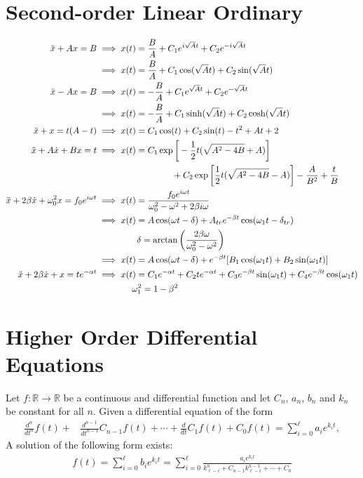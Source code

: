 \section{Second-order Linear Ordinary}
\begin{align}
\ddot{x}+Ax=B &\implies x(t)=\frac{B}{A}+C_1e^{i\sqrt{A}t}+C_2e^{-i\sqrt{A}t} \\ &\implies x(t)=\frac{B}{A}+C_1\cos(\sqrt{A}t)+C_2\sin(\sqrt{A}t) \\
\ddot{x}-Ax=B &\implies x(t)=-\frac{B}{A}+C_1e^{\sqrt{A}t}+C_2e^{-\sqrt{A}t} \\
&\implies x(t)=-\frac{B}{A}+C_1\sinh(\sqrt{A}t)+C_2\cosh(\sqrt{A}t) \\
\ddot{x}+x=t(A-t) &\implies x(t)=C_1\cos(t)+C_2\sin(t)-t^2+At+2 \\ 
\ddot{x}+A\dot{x}+Bx =t &\implies x(t)=C_1\exp\bigg[-\frac{1}{2}t(\sqrt{A^2-4B}+A)\bigg] \\& \hspace{3cm} +C_2\exp\bigg[\frac{1}{2}t(\sqrt{A^2-4B}-A)\bigg]-\frac{A}{B^2}+\frac{t}{B} \\
\ddot{x}+2\beta\dot{x}+\omega_0^2x=f_0e^{i\omega t} &\implies x(t)=\frac{f_0e^{i\omega t}}{\omega_0^2-\omega^2+2\beta i\omega} \\
&\implies x(t)=A\cos(\omega t-\delta)+A_{tr}e^{-\beta t}\cos(\omega_1t-\delta_{tr}) \\
&\hspace{1.6cm}\delta=\arctan\bigg(\frac{2\beta \omega}{\omega_0^2-\omega^2} \bigg) \\
&\implies x(t)=A\cos(\omega t-\delta)+e^{-\beta t}[B_1\cos(\omega_1 t)+B_2\sin(\omega_1 t)] \\
\ddot{x}+2\beta\dot{x}+x=te^{-\alpha t} &\implies x(t)=C_1e^{-\alpha t}+C_2te^{-\alpha t}+C_3e^{-\beta t}\sin(\omega_1 t)+C_4e^{-\beta t}\cos(\omega_1 t) \\
&\hspace{1.4cm}\omega_1^2=1-\beta^2
\end{align}




\section{Higher Order Differential Equations}
\begin{fancybox}{}
	Let $f:\mathbb{R}\rightarrow\mathbb{R}$ be a continuous and differential function and let $C_n$, $a_n$, $b_n$ and $k_n$ be constant for all $n$. Given a differential equation of the form
	\begin{align*}
	\frac{d^n}{dt^n}f(t)+&\frac{d^{n-1}}{dt^{n-1}}C_{n-1}f(t)+\cdots+\frac{d}{dt}C_1f(t)+C_0f(t)=\sum_{i=0}^{\ell}a_i e^{k_i t},
	\end{align*}
	A solution of the following form exists:
	\begin{align*}
	f(t)=\sum_{i=0}^{\ell}b_i e^{k_i t}=\sum_{i=0}^{\ell}\frac{a_ie^{k_it}}{k_{\ell-i}^n +C_{n-1} k_{\ell-i}^{n-1} +\cdots+C_0} 
	\end{align*}
\end{fancybox}



